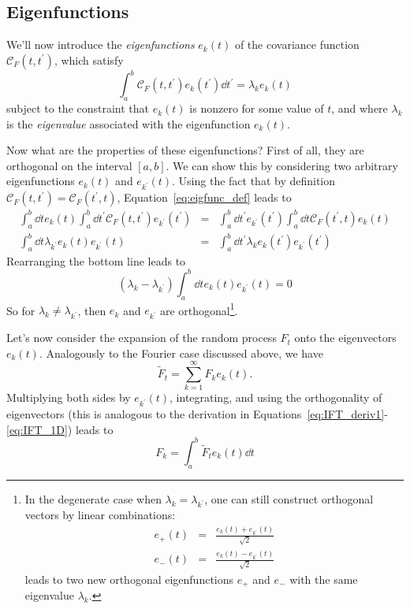 \subsection{Eigenfunctions}
We'll now introduce the {\it eigenfunctions} $e_k(t)$
of the covariance function $\mathcal{C}_F(t, t^\prime)$, which satisfy
\begin{equation}
  \label{eq:eigfunc_def}
  \int_a^b \mathcal{C}_F(t, t^\prime) e_k(t^\prime)\dd t^\prime
  = \lambda_k e_k(t)
\end{equation}
subject to the constraint that $e_k(t)$ is nonzero for some value of $t$,
and where $\lambda_k$ is the {\it eigenvalue} associated with the
eigenfunction $e_k(t)$.

Now what are the properties of these eigenfunctions?  First of all, they
are orthogonal on the interval $[a, b]$.
We can show this by considering two arbitrary eigenfunctions
$e_k(t)$ and $e_{k^\prime}(t)$.  Using the fact that by definition
$\mathcal{C}_F(t, t^\prime) = \mathcal{C}_F(t^\prime, t)$, 
Equation~\ref{eq:eigfunc_def} leads to
\begin{eqnarray}
  \int_a^b \dd t e_k(t)
  \int_a^b \dd t^\prime \mathcal{C}_F(t, t^\prime) e_{k^\prime}(t^\prime) &=&
  \int_a^b \dd t^\prime e_{k^\prime}(t^\prime)
  \int_a^b \dd t \mathcal{C}_F(t^\prime, t) e_k(t)
  \nonumber\\
  \int_a^b \dd t \lambda_{k^\prime} e_k(t) e_{k^\prime}(t) &=&
  \int_a^b \dd t^\prime \lambda_k e_k(t^\prime) e_{k^\prime}(t^\prime)
\end{eqnarray}
Rearranging the bottom line leads to
\begin{equation}
  (\lambda_k - \lambda_{k^\prime})
  \int_a^b \dd t e_k(t) e_{k^\prime}(t) = 0
\end{equation}
So for $\lambda_k \ne \lambda_{k^\prime}$, then
$e_k$ and $e_{k^\prime}$ are orthogonal\footnote{In the degenerate case when
$\lambda_k = \lambda_{k^\prime}$, one can still construct orthogonal
vectors by linear combinations:
\begin{eqnarray}
  e_+(t) &=& \frac{e_k(t) + e_{k^\prime}(t)}{\sqrt{2}} \nonumber\\
  e_-(t) &=& \frac{e_k(t) - e_{k^\prime}(t)}{\sqrt{2}} \nonumber
\end{eqnarray}
leads to two new orthogonal eigenfunctions $e_+$ and $e_-$ with the
same eigenvalue $\lambda_k$.}.

Let's now consider the expansion of the random process $F_t$ onto the
eigenvectors $e_k(t)$.  Analogously to the Fourier case discussed
above, we have
\begin{equation}
  \tilde{F}_t = \sum_{k=1}^\infty F_k e_k(t).
\end{equation}
Multiplying both sides by $e_{k^\prime}(t)$, integrating, and using the
orthogonality of eigenvectors (this is analogous to the derivation
in Equations~\ref{eq:IFT_deriv1}-\ref{eq:IFT_1D}) leads to
\begin{equation}
  \label{eq:F_k_def}
  F_k = \int_a^b \tilde{F}_t e_k(t) \dd t
\end{equation}

